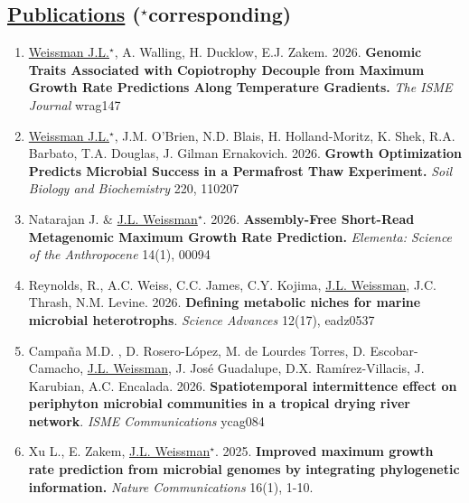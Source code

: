 \documentclass[]{res}
\begin{document}
\begin{resume}
 

 
 \section{\underline{Publications} ($^\star$corresponding)} 
 
\begin{enumerate}
 \setlength\itemsep{0.2em}
 
\section{Research Articles:} \vspace{0mm}

 \item \underline{Weissman J.L.$^\star$},  A. Walling, H. Ducklow, E.J. Zakem. 2026. {\bf  Genomic Traits Associated with Copiotrophy Decouple from Maximum Growth Rate Predictions Along Temperature Gradients.}  \emph{The ISME Journal} wrag147
 
 \item \underline{Weissman J.L.$^\star$}, J.M. O'Brien, N.D. Blais, H. Holland-Moritz, K. Shek, R.A. Barbato, T.A. Douglas, J. Gilman Ernakovich. 2026. {\bf Growth Optimization Predicts Microbial Success in a Permafrost Thaw Experiment.} \emph{Soil Biology and Biochemistry} 220, 110207

\item Natarajan J. \& \underline{J.L. Weissman$^\star$}. 2026. {\bf Assembly-Free Short-Read Metagenomic Maximum Growth Rate Prediction.} \emph{Elementa: Science of the Anthropocene}  14(1), 00094
 
 \item Reynolds, R., A.C. Weiss, C.C. James, C.Y. Kojima, \underline{J.L. Weissman}, J.C. Thrash, N.M. Levine. 2026. {\bf Defining metabolic niches for marine microbial heterotrophs}. \emph{Science Advances} 12(17), eadz0537
 
\item Campaña M.D. , D. Rosero-López, M. de Lourdes Torres, D. Escobar-Camacho, \underline{J.L. Weissman}, J. José Guadalupe, D.X. Ramírez-Villacis, J. Karubian, A.C. Encalada. 2026. {\bf Spatiotemporal intermittence effect on periphyton microbial communities in a tropical drying river network}. \emph{ISME Communications} ycag084

\item Xu L., E. Zakem, \underline{J.L. Weissman$^\star$}. 2025. {\bf Improved maximum growth rate prediction from microbial genomes by integrating phylogenetic information.} \emph{Nature Communications} 16(1), 1-10.
  

\end{enumerate}
\end{resume}
\end{document}
